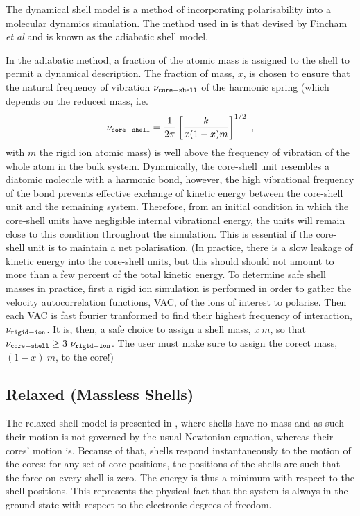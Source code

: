 The dynamical shell model is a method of incorporating
polarisability into a molecular dynamics simulation.
The method used in \D is that devised by Fincham {\em et al}
\cite{fincham-93a} and is known as the adiabatic shell model.

In the adiabatic method, a fraction of the atomic mass is assigned
to the shell to permit a dynamical description.  The fraction of
mass, $x$, is chosen to ensure that the natural frequency of
vibration $\nu_{\tt core-shell}$ of the harmonic spring (which
depends on the reduced mass, i.e.
\begin{equation}
\nu_{\tt core-shell} = \frac{1}{2\pi} \left[ \frac{k}{x(1-x)m} \right]^{1/2}~,
\end{equation}
with $m$ the rigid ion atomic mass) is well above the frequency of
vibration of the whole atom in the bulk system.  Dynamically,
the core-shell unit resembles a diatomic molecule with a harmonic
bond, however, the high vibrational
frequency of the bond prevents effective exchange of kinetic
energy between the core-shell unit and the remaining system.
Therefore, from an initial condition in which the core-shell units
have negligible internal vibrational energy, the units will remain
close to this condition throughout the simulation.  This is
essential if the core-shell unit is to maintain a net
polarisation.  (In practice, there is a slow
leakage of kinetic energy into the core-shell units, but this
should should not amount to more than a few percent of the total
kinetic energy.  To determine safe shell masses in practice,
first a rigid ion simulation is performed in order to gather the
velocity autocorrelation functions, VAC, of the ions of interest
to polarise.  Then each VAC is fast fourier tranformed to find
their highest frequency of interaction, $\nu_{\tt rigid-ion}$.  It
is, then, a safe choice to assign a shell mass, $x~m$, so that
$\nu_{\tt core-shell} \geq 3~\nu_{\tt rigid-ion}$.  The user must
make sure to assign the corect mass, $(1-x)~m$, to the core!)

\subsection{Relaxed (Massless Shells)}

The relaxed shell model is presented in \cite{lindan-93a}, where
shells have no mass and as such their motion is not governed
by the usual Newtonian equation, whereas their cores' motion is.
Because of that, shells respond instantaneously to the motion
of the cores: for any set of core positions, the positions of
the shells are such that the force on every shell is zero.  The
energy is thus a minimum with respect to the shell positions.
This represents the physical fact that the system is always in the
ground state with respect to the electronic degrees of freedom.

